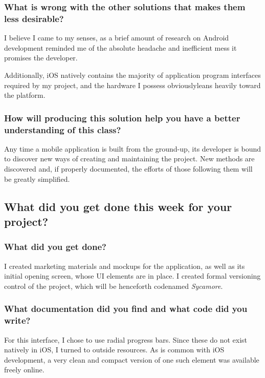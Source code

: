 \documentclass[letterpaper]{article}            %
\begin{document}
\subsubsection{What is wrong with the other solutions that makes them less desirable?}

I believe I came to my senses, as a brief amount of research on Android development reminded me of the absolute headache and inefficient mess it promises the developer. 

Additionally, iOS natively contains the majority of application program interfaces required by my project, and the hardware I possess obviouslyleans heavily toward the platform.

\subsubsection{How will producing this solution help you have a better understanding of this class?}

Any time a mobile application is built from the ground-up, its developer is bound to discover new ways of creating and maintaining the project. New methods are discovered and, if properly documented, the efforts of those following them will be greatly simplified.


\subsection{What did you get done this week for your project?}

\subsubsection{What did you get done?}

I created marketing materials and mockups for the application, as well as its initial opening screen, whose UI elements are in place. I created formal versioning control of the project, which will be henceforth codenamed \textit{Sycamore}.

\subsubsection{What documentation did you find and what code did you write?}

For this interface, I chose to use radial progress bars. Since these do not exist natively in iOS, I turned to outside resources. As is common with iOS development, a very clean and compact version of one such element was available freely online.
\end{document}
